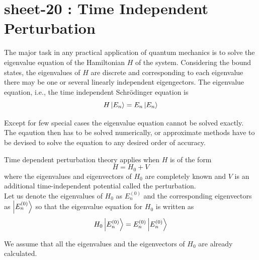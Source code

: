 %
%
%

\chapter{sheet-20 : Time Independent Perturbation}
\ifpdf
\graphicspath{{Chapter20/figs/}}
\else
\graphicspath{{Chapter20/figs/}}
\fi

The major task in any practical application of quantum mechanics is to solve the eigenvalue equation of the Hamiltonian $H$ of the system. Considering the bound states, the eigenvalues of $H$ are discrete and corresponding to each eigenvalue there may be one or several linearly independent eigengectors. The eigenvalue equation, i.e., the time independent Schr\"{o}dinger equation is 
\begin{equation}
	H \ket{E_n} = E_n \ket{E_n}
	\label{chapter20.eqn1-intro}
\end{equation}

Except for few special cases the eigenvalue equation cannot be solved exactly. The eqaution then has to be solved numerically, or approximate methods have to be devised to solve the equation to any desired order of accuracy.

Time dependent perturbation theory applies when $H$ is of the form
\begin{equation}
	H = H_0 + V
	\label{chapter20.eqn2-intro}
\end{equation}
where the eigenvalues and eigenvectors of $H_0$ are completely known and $V$ is an additional time-independent potential called the perturbation.\\


Let us denote the eigenvalues of $H_0$ as $E_n^{(0)}$ and the corresponding eigenvectors as $\ket{E_n^{(0)}}$  so that the eigenvalue equation for $H_0$ is written as
\begin{equation}
	H_0 \ket{E_n^{(0)}} = E_n^{(0)} \ket{E_n^{(0)}}
	\label{chapter20.eqn3-intro}
\end{equation}

We assume that all the eigenvalues and the eigenvectors of $H_0$ are already calculated.

